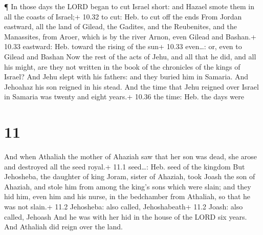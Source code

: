  ¶ In those days the LORD began to cut Israel short: and
Hazael smote them in all the coasts of Israel;+ 10.32 to cut: Heb. to
cut off the ends  From Jordan eastward, all the land of
Gilead, the Gadites, and the Reubenites, and the Manassites, from Aroer,
which is by the river Arnon, even Gilead and Bashan.+ 10.33 eastward:
Heb. toward the rising of the sun+ 10.33 even\ldots: or, even to Gilead
and Bashan  Now the rest of the acts of Jehu, and all that
he did, and all his might, are they not written in the book of the
chronicles of the kings of Israel?  And Jehu slept with his
fathers: and they buried him in Samaria. And Jehoahaz his son reigned in
his stead.  And the time that Jehu reigned over Israel in
Samaria was twenty and eight years.+ 10.36 the time: Heb. the days were

\hypertarget{section-10}{%
\section{11}\label{section-10}}

 And when Athaliah the mother of Ahaziah saw that her son
was dead, she arose and destroyed all the seed royal.+ 11.1 seed\ldots:
Heb. seed of the kingdom  But Jehosheba, the daughter of
king Joram, sister of Ahaziah, took Joash the son of Ahaziah, and stole
him from among the king's sons which were slain; and they hid him, even
him and his nurse, in the bedchamber from Athaliah, so that he was not
slain.+ 11.2 Jehosheba: also called, Jehoshabeath+ 11.2 Joash: also
called, Jehoash  And he was with her hid in the house of the
LORD six years. And Athaliah did reign over the land.

